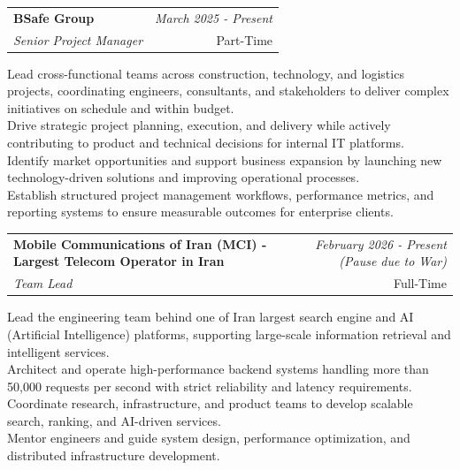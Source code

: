 \documentclass[a4paper,10pt]{article}
\makeatletter
\newcommand{\resumeSubheading}[4]{
	\vspace{0.5mm}\item
	\begin{tabular*}{0.98\textwidth}[t]{l@{\extracolsep{\fill}}r}
		\textbf{#1} & \textit{\footnotesize{#4}} \\
		\textit{\footnotesize{#3}} &  \footnotesize{#2}\\
	\end{tabular*}
	\vspace{-2.4mm}
}
\newcommand{\resumeItemListStart}{\begin{justify}\begin{itemize}[leftmargin=3ex, rightmargin=2ex, noitemsep,labelsep=1.2mm,itemsep=0mm]\small}
\newcommand{\resumeItemListEnd}{\end{itemize}\end{justify}\vspace{-2mm}}
\makeatother
\begin{document}
\vspace{-1mm}
\resumeSubheading
{BSafe Group}{Part-Time}
{Senior Project Manager}{March 2025 - Present}
\resumeItemListStart
Lead cross-functional teams across construction, technology, and logistics projects, coordinating engineers, consultants, and stakeholders to deliver complex initiatives on schedule and within budget.\\
Drive strategic project planning, execution, and delivery while actively contributing to product and technical decisions for internal IT platforms.\\
Identify market opportunities and support business expansion by launching new technology-driven solutions and improving operational processes.\\
Establish structured project management workflows, performance metrics, and reporting systems to ensure measurable outcomes for enterprise clients.
\resumeItemListEnd

\vspace{-1mm}
\resumeSubheading
{Mobile Communications of Iran (MCI) - Largest Telecom Operator in Iran}{Full-Time}
{Team Lead}{February 2026 - Present (Pause due to War)}
\resumeItemListStart
Lead the engineering team behind one of Iran largest search engine and AI (Artificial Intelligence) platforms, supporting large-scale information retrieval and intelligent services.\\
Architect and operate high-performance backend systems handling more than 50,000 requests per second with strict reliability and latency requirements.\\
Coordinate research, infrastructure, and product teams to develop scalable search, ranking, and AI-driven services.\\
Mentor engineers and guide system design, performance optimization, and distributed infrastructure development.
\resumeItemListEnd
\end{document}
